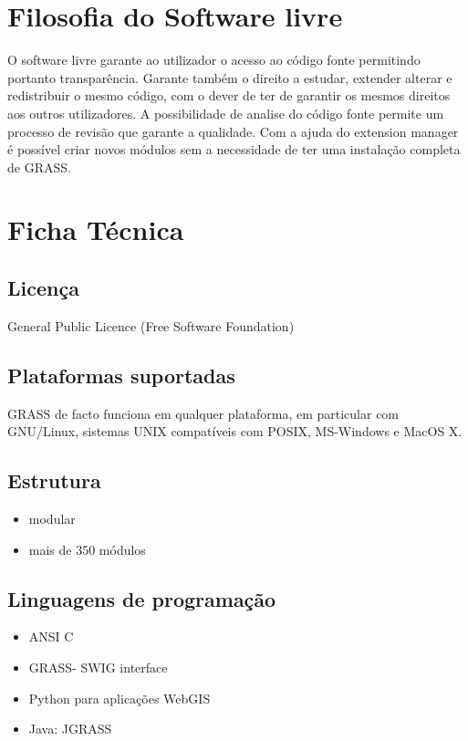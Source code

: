 \documentclass[notumble,a4paper,10pt,nofoldmark]{leaflet}
\begin{document}
\section{Filosofia do Software livre}

O software livre garante ao utilizador o acesso ao c\'{o}digo fonte permitindo portanto transpar\^{e}ncia. Garante tamb\'{e}m o direito a estudar, extender alterar e redistribuir o mesmo c\'{o}digo, com o dever de ter de garantir os mesmos direitos aos outros utilizadores. A possibilidade de analise do c\'{o}digo fonte permite um processo de revis\~{a}o que garante a qualidade. Com a ajuda do extension manager \'{e} poss\'{i}vel criar novos m\'{o}dulos sem a necessidade de ter uma instala\c{c}\~{a}o completa de GRASS. 

\section{Ficha T\'{e}cnica}

\subsection{Licen\c{c}a}

General Public Licence (Free Software Foundation)

\subsection{Plataformas suportadas}

GRASS de facto funciona em qualquer plataforma, em particular com GNU/Linux, sistemas UNIX compat\'{i}veis com POSIX, MS-Windows e MacOS X.

\subsection{Estrutura}

\begin{itemize}
\item modular
\item mais de 350 m\'{o}dulos
\end{itemize}

\subsection{Linguagens de programa\c{c}\~{a}o}

\begin{itemize}
\item ANSI C
\item GRASS- SWIG interface
\item Python para aplica\c{c}\~{o}es WebGIS
\item Java: JGRASS
\end{itemize}
\end{document}

